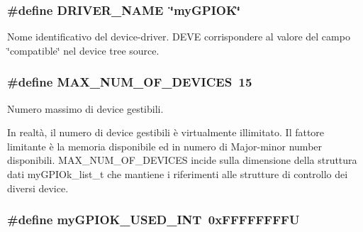 \hypertarget{group___linux-_driver_ga25634d21648ca7fb7a2aca614bafaaeb}{
\subsubsection[{D\+R\+I\+V\+E\+R\+\_\+\+N\+A\+M\+E}]{\setlength{\rightskip}{0pt plus 5cm}\#define D\+R\+I\+V\+E\+R\+\_\+\+N\+A\+M\+E~\char`\"{}my\+G\+P\+I\+O\+K\char`\"{}}}\label{group___linux-_driver_ga25634d21648ca7fb7a2aca614bafaaeb}


Nome identificativo del device-\/driver. D\+E\+V\+E corrispondere al valore del campo \char`\"{}compatible\char`\"{} nel device tree source. 

\hypertarget{group___linux-_driver_gad32bf20eb64878cb958ca6ac9c96c21d}{
\subsubsection[{M\+A\+X\+\_\+\+N\+U\+M\+\_\+\+O\+F\+\_\+\+D\+E\+V\+I\+C\+E\+S}]{\setlength{\rightskip}{0pt plus 5cm}\#define M\+A\+X\+\_\+\+N\+U\+M\+\_\+\+O\+F\+\_\+\+D\+E\+V\+I\+C\+E\+S~15}}\label{group___linux-_driver_gad32bf20eb64878cb958ca6ac9c96c21d}


Numero massimo di device gestibili. 

In realtà, il numero di device gestibili è virtualmente illimitato. Il fattore limitante è la memoria disponibile ed in numero di Major-\/minor number disponibili. M\+A\+X\+\_\+\+N\+U\+M\+\_\+\+O\+F\+\_\+\+D\+E\+V\+I\+C\+E\+S incide sulla dimensione della struttura dati my\+G\+P\+I\+Ok\+\_\+list\+\_\+t che mantiene i riferimenti alle strutture di controllo dei diversi device. \hypertarget{group___linux-_driver_ga78d3a23bb3381a43eaba8bbf8b1cc750}{
\subsubsection[{my\+G\+P\+I\+O\+K\+\_\+\+U\+S\+E\+D\+\_\+\+I\+N\+T}]{\setlength{\rightskip}{0pt plus 5cm}\#define my\+G\+P\+I\+O\+K\+\_\+\+U\+S\+E\+D\+\_\+\+I\+N\+T~0x\+F\+F\+F\+F\+F\+F\+F\+F\+U}}\label{group___linux-_driver_ga78d3a23bb3381a43eaba8bbf8b1cc750}


